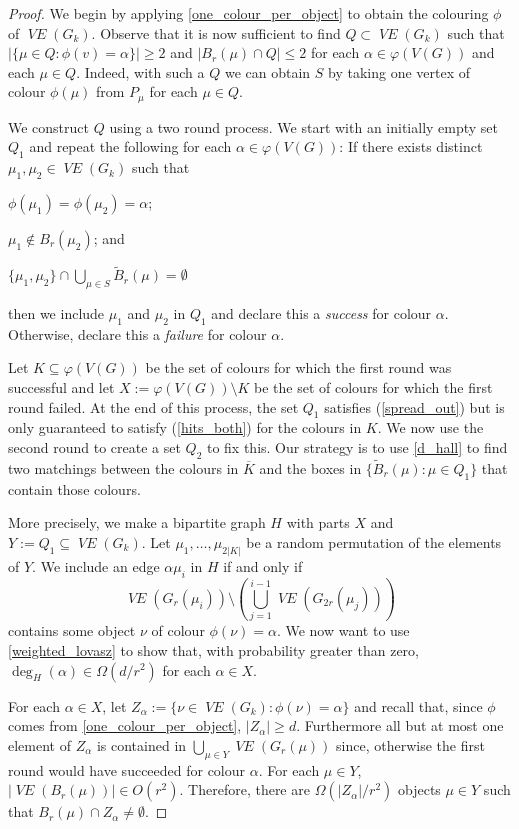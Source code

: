 \documentclass{patmorin}
\newcommand{\defin}[1]{\emph{\color{brown}#1}}
\DeclareMathOperator{\VE}{\mathit{VE}}
\begin{document}
\begin{proof}
  We begin by applying \cref{one_colour_per_object} to obtain the colouring $\phi$ of $\VE(G_k)$.  Observe that it is now sufficient to find $Q\subset\VE(G_k)$ such that $|\{\mu\in Q:\phi(v)=\alpha\}|\ge 2$ and $|B_r(\mu)\cap Q|\le 2$ for each $\alpha\in\varphi(V(G))$ and each $\mu\in Q$.  Indeed, with such a $Q$ we can obtain $S$ by taking one vertex of colour $\phi(\mu)$ from $P_\mu$ for each $\mu\in Q$.

  We construct $Q$ using a two round process.  We start with an initially empty set $Q_1$ and repeat the following for each $\alpha\in\varphi(V(G))$:
  If there exists distinct $\mu_1,\mu_2\in\VE(G_k)$ such that
  \begin{compactenum}[(a)]
    \item $\phi(\mu_1)=\phi(\mu_2)=\alpha$;
    \item $\mu_1\not\in B_r(\mu_2)$; and
    \item $\{\mu_1,\mu_2\}\cap \bigcup_{\mu\in S} \tilde{B}_{r}(\mu)=\emptyset$
  \end{compactenum}
  then we include $\mu_1$ and $\mu_2$ in $Q_1$ and declare this a \defin{success} for colour $\alpha$.  Otherwise, declare this a \defin{failure} for colour $\alpha$.

  Let $K\subseteq\varphi(V(G))$ be the set of colours for which the first round was successful and let $X:=\varphi(V(G))\setminus K$ be the set of colours for which the first round failed.  At the end of this process, the set $Q_1$ satisfies (\ref{spread_out}) but is only guaranteed to satisfy (\ref{hits_both}) for the colours in $K$.  We now use the second round to create a set $Q_2$ to fix this. Our strategy is to use \cref{d_hall} to find two matchings between the colours in $\overline{K}$ and the boxes in $\{\tilde{B}_r(\mu):\mu\in Q_1\}$ that contain those colours.

  More precisely, we make a bipartite graph $H$ with parts $X$ and $Y:=Q_1\subseteq\VE(G_k)$.  Let $\mu_1,\ldots,\mu_{2|K|}$ be a random permutation of the elements of $Y$.  We include an edge $\alpha\mu_i$ in $H$ if and only if
  \[
    \VE(G_r(\mu_i))\setminus\left(\bigcup_{j=1}^{i-1}\VE(G_{2r}(\mu_j))\right)
  \]
  contains some object $\nu$ of colour $\phi(\nu)=\alpha$.  We now want to use \cref{weighted_lovasz} to show that, with probability greater than zero, $\deg_H(\alpha)\in \Omega(d/r^2)$ for each $\alpha\in X$.

  For each $\alpha\in X$, let $Z_\alpha:=\{\nu\in\VE(G_k):\phi(\nu)=\alpha\}$ and recall that, since $\phi$ comes from \cref{one_colour_per_object}, $|Z_\alpha| \ge d$.  Furthermore all but at most one element of $Z_\alpha$ is contained in $\bigcup_{\mu\in Y}\VE(G_r(\mu))$ since, otherwise the first round would have succeeded for colour $\alpha$.  For each $\mu\in Y$, $|\VE(B_r(\mu))|\in O(r^2)$. Therefore, there are $\Omega(|Z_\alpha|/r^2)$ objects $\mu\in Y$ such that $B_r(\mu)\cap Z_\alpha\neq\emptyset$.


\end{proof}
\end{document}
